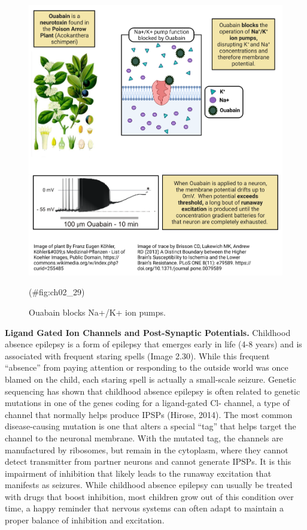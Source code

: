 \documentclass[
]{book}
\begin{document}
\begin{figure}

{\centering \includegraphics[width=0.8\linewidth]{images/ch02/02_28} 

}

\caption{Ouabain blocks Na+/K+ ion pumps.}(\#fig:ch02_29)
\end{figure}

\textbf{Ligand Gated Ion Channels and Post-Synaptic Potentials. }Childhood absence epilepsy is a form of epilepsy that emerges early in life (4-8 years) and is associated with frequent staring spells (Image 2.30). While this frequent ``absence'' from paying attention or responding to the outside world was once blamed on the child, each staring spell is actually a small-scale seizure. Genetic sequencing has shown that childhood absence epilepsy is often related to genetic mutations in one of the genes coding for a ligand-gated Cl- channel, a type of channel that normally helps produce IPSPs (Hirose, 2014). The most common disease-causing mutation is one that alters a special ``tag'' that helps target the channel to the neuronal membrane. With the mutated tag, the channels are manufactured by ribosomes, but remain in the cytoplasm, where they cannot detect transmitter from partner neurons and cannot generate IPSPs. It is this impairment of inhibition that likely leads to the runaway excitation that manifests as seizures. While childhood absence epilepsy can usually be treated with drugs that boost inhibition, most children grow out of this condition over time, a happy reminder that nervous systems can often adapt to maintain a proper balance of inhibition and excitation.
\end{document}
